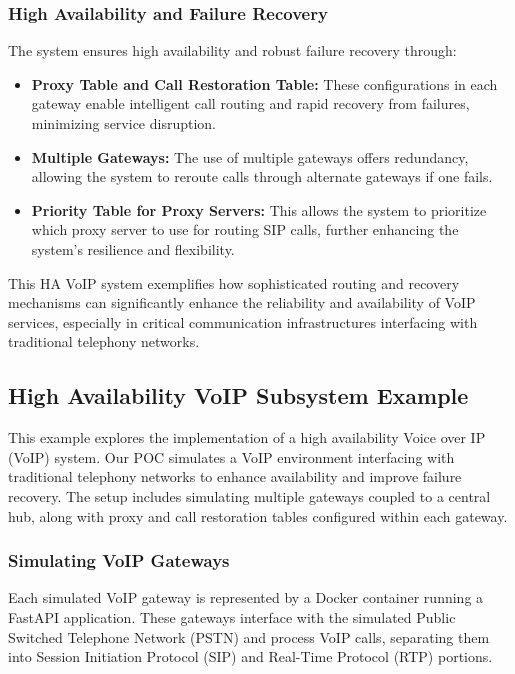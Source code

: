 \documentclass[12pt]{article}
\begin{document}
\subsubsection{High Availability and Failure Recovery}

The system ensures high availability and robust failure recovery through:

\begin{itemize}
    \item \textbf{Proxy Table and Call Restoration Table:} These configurations in each gateway enable intelligent call routing and rapid recovery from failures, minimizing service disruption.
    \item \textbf{Multiple Gateways:} The use of multiple gateways offers redundancy, allowing the system to reroute calls through alternate gateways if one fails.
    \item \textbf{Priority Table for Proxy Servers:} This allows the system to prioritize which proxy server to use for routing SIP calls, further enhancing the system's resilience and flexibility.
\end{itemize}

This HA VoIP system exemplifies how sophisticated routing and recovery mechanisms can significantly enhance the reliability and availability of VoIP services, especially in critical communication infrastructures interfacing with traditional telephony networks.

\subsection{High Availability VoIP Subsystem Example}

This example explores the implementation of a high availability Voice over IP (VoIP) system. Our POC simulates a VoIP environment interfacing with traditional telephony networks to enhance availability and improve failure recovery. The setup includes simulating multiple gateways coupled to a central hub, along with proxy and call restoration tables configured within each gateway.

\subsubsection{Simulating VoIP Gateways}

Each simulated VoIP gateway is represented by a Docker container running a FastAPI application. These gateways interface with the simulated Public Switched Telephone Network (PSTN) and process VoIP calls, separating them into Session Initiation Protocol (SIP) and Real-Time Protocol (RTP) portions.
\end{document}
